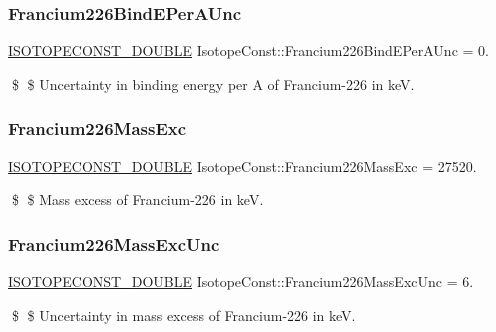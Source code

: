 \subsubsection{\texorpdfstring{Francium226\+Bind\+E\+Per\+A\+Unc}{Francium226BindEPerAUnc}}
{\footnotesize\ttfamily \mbox{\hyperlink{group___isotope_const-_macros_ga8f45a7272ce02c0b4c65c44636ed719a}{I\+S\+O\+T\+O\+P\+E\+C\+O\+N\+S\+T\+\_\+\+D\+O\+U\+B\+LE}} Isotope\+Const\+::\+Francium226\+Bind\+E\+Per\+A\+Unc = 0.}

\$ \$ Uncertainty in binding energy per A of Francium-\/226 in keV. \mbox{\label{group___isotope_const-_francium-_fr226_gaf4eae22486069862928b611445fc464c}} 
\subsubsection{\texorpdfstring{Francium226\+Mass\+Exc}{Francium226MassExc}}
{\footnotesize\ttfamily \mbox{\hyperlink{group___isotope_const-_macros_ga8f45a7272ce02c0b4c65c44636ed719a}{I\+S\+O\+T\+O\+P\+E\+C\+O\+N\+S\+T\+\_\+\+D\+O\+U\+B\+LE}} Isotope\+Const\+::\+Francium226\+Mass\+Exc = 27520.}

\$ \$ Mass excess of Francium-\/226 in keV. \mbox{\label{group___isotope_const-_francium-_fr226_ga57c2587be519012cecc57438eca5393d}} 
\subsubsection{\texorpdfstring{Francium226\+Mass\+Exc\+Unc}{Francium226MassExcUnc}}
{\footnotesize\ttfamily \mbox{\hyperlink{group___isotope_const-_macros_ga8f45a7272ce02c0b4c65c44636ed719a}{I\+S\+O\+T\+O\+P\+E\+C\+O\+N\+S\+T\+\_\+\+D\+O\+U\+B\+LE}} Isotope\+Const\+::\+Francium226\+Mass\+Exc\+Unc = 6.}

\$ \$ Uncertainty in mass excess of Francium-\/226 in keV. \mbox{\label{group___isotope_const-_francium-_fr226_gab0020107c42804717427967e92d0709b}} 
